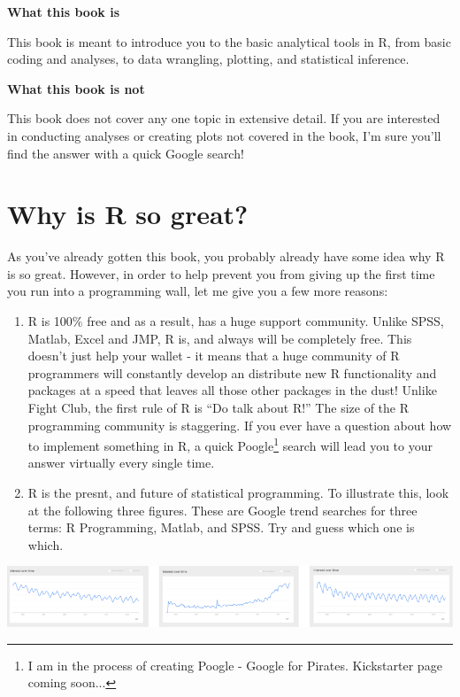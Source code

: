 \documentclass[]{book}
\let\rmarkdownfootnote\footnote%
\def\footnote{\protect\rmarkdownfootnote}
\theoremstyle{definition}
\theoremstyle{definition}
\theoremstyle{remark}
\begin{document}
\textbf{What this book is}

This book is meant to introduce you to the basic analytical tools in R,
from basic coding and analyses, to data wrangling, plotting, and
statistical inference.

\textbf{What this book is not}

This book does not cover any one topic in extensive detail. If you are
interested in conducting analyses or creating plots not covered in the
book, I'm sure you'll find the answer with a quick Google search!

\section{Why is R so great?}\label{why-is-r-so-great}

As you've already gotten this book, you probably already have some idea
why R is so great. However, in order to help prevent you from giving up
the first time you run into a programming wall, let me give you a few
more reasons:

\begin{enumerate}
\def\labelenumi{\arabic{enumi}.}
\item
  R is 100\% free and as a result, has a huge support community. Unlike
  SPSS, Matlab, Excel and JMP, R is, and always will be completely free.
  This doesn't just help your wallet - it means that a huge community of
  R programmers will constantly develop an distribute new R
  functionality and packages at a speed that leaves all those other
  packages in the dust! Unlike Fight Club, the first rule of R is ``Do
  talk about R!'' The size of the R programming community is staggering.
  If you ever have a question about how to implement something in R, a
  quick
  Poogle\footnote{I am in the process of creating Poogle - Google for Pirates. Kickstarter page coming soon...}
  search will lead you to your answer virtually every single time.
\item
  R is the presnt, and future of statistical programming. To illustrate
  this, look at the following three figures. These are Google trend
  searches for three terms: R Programming, Matlab, and SPSS. Try and
  guess which one is which.
\end{enumerate}

\includegraphics{images/googletrends.png}
\end{document}
